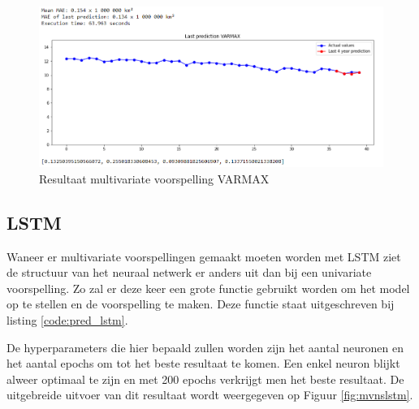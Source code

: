 \begin{figure}
    \centering
    \caption{Resultaat multivariate voorspelling VARMAX}
    \label{fig:mvnsvarmax}
    \includegraphics[width=1\linewidth]{mv_ns_varmax}
\end{figure}


\subsection{LSTM}

Waneer er multivariate voorspellingen gemaakt moeten worden met LSTM ziet de structuur van het neuraal netwerk er anders uit dan bij een univariate voorspelling. Zo zal er deze keer een grote functie gebruikt worden om het model op te stellen en de voorspelling te maken. Deze functie staat uitgeschreven bij listing \ref{code:pred_lstm}.

De hyperparameters die hier bepaald zullen worden zijn het aantal neuronen en het aantal epochs om tot het beste resultaat te komen. Een enkel neuron blijkt alweer optimaal te zijn en met 200 epochs verkrijgt men het beste resultaat. De uitgebreide uitvoer van dit resultaat wordt weergegeven op Figuur \ref{fig:mvnslstm}.

